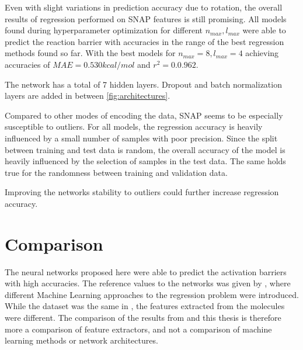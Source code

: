 Even with slight variations in prediction accuracy due to rotation, the overall results of regression performed on SNAP features is still promising.
All models found during hyperparameter optimization for different $n_{max}, l_{max}$ were able to predict the reaction barrier with accuracies in the
range of the best regression methods found so far.
With the best models for $n_{max}=8, l_{max}=4$ achieving accuracies of $MAE=0.530 kcal/mol$ and $r^2=0.0.962$. %

The network has a total of 7 hidden layers.
Dropout and batch normalization layers are added in between \ref{fig:architectures}.

Compared to other modes of encoding the data, SNAP seems to be especially susceptible to outliers.
For all models, the regression accuracy is heavily influenced by a small number of samples with poor precision.
Since the split between training and test data is random, the overall accuracy of the model is 
heavily influenced by the selection of samples in the test data.
The same holds true for the randomness between training and validation data.

Improving the networks stability to outliers could further increase regression accuracy.


\section{Comparison}
\label{sec:Evaluation:Comparison}

The neural networks proposed here were able to predict the activation barriers with high accuracies.
The reference values to the networks was given by \cite{friederich_dos}, where different Machine Learning 
approaches to the regression problem were introduced.
While the dataset was the same in \cite{friederich_dos}, the features extracted from the molecules were different.
The comparison of the results from  and this thesis is therefore more 
a comparison of feature extractors, and not a comparison of machine learning methods or network architectures.

